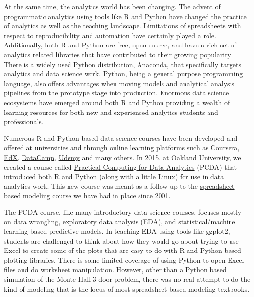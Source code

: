 \documentclass[ited,blindrev]{informs3}              %
\begin{document}
At the same time, the analytics world has been changing. The advent of programmatic analytics using tools like \href{https://www.r-project.org/}{R} and \href{https://www.python.org/}{Python} have changed the practice of analytics as well as the teaching landscape. Limitations of spreadsheets with respect to reproducibility and automation have certainly played a role.  Additionally, both R and Python are free, open source, and have a rich set of analytics related libraries that have contributed to their growing popularity. There is a widely used Python distribution, \href{https://www.anaconda.com/download}{Anaconda}, that specifically targets analytics and data science work. Python, being a general purpose programming language, also offers advantages when moving models and analytical analysis pipelines from the prototype stage into production. Enormous data science ecosystems have emerged around both R and Python providing a wealth of learning resources for both new and experienced analytics students and professionals.

Numerous R and Python based data science courses have been developed and offered at universities and through online learning platforms such as \href{https://www.coursera.org/browse/data-science}{Coursera}, \href{https://www.edx.org/learn/data-science}{EdX}, \href{https://www.datacamp.com/}{DataCamp}, \href{https://www.udemy.com/topic/data-analysis/}{Udemy} and many others. In 2015, at Oakland University, we created a course called \href{http://www.sba.oakland.edu/faculty/isken/courses/pcda/}{Practical Computing for Data Analytics} (PCDA) that introduced both R and Python (along with a little Linux) for use in data analytics work. This new course was meant as a follow up to the \href{http://www.sba.oakland.edu/faculty/isken/courses/ba/}{spreadsheet based modeling course} we have had in place since 2001.

The PCDA course, like many introductory data science courses, focuses mostly on data wrangling, exploratory data analysis (EDA), and statistical/machine learning based predictive models. In teaching EDA using tools like ggplot2, students are challenged to think about how they would go about trying to use Excel to create some of the plots that are easy to do with R and Python based plotting libraries. There is some limited coverage of using Python to open Excel files and do worksheet manipulation. However, other than a Python based simulation of the Monte Hall 3-door problem, there was no real attempt to do the kind of modeling that is the focus of most spreadsheet based modeling textbooks. 
\end{document}
